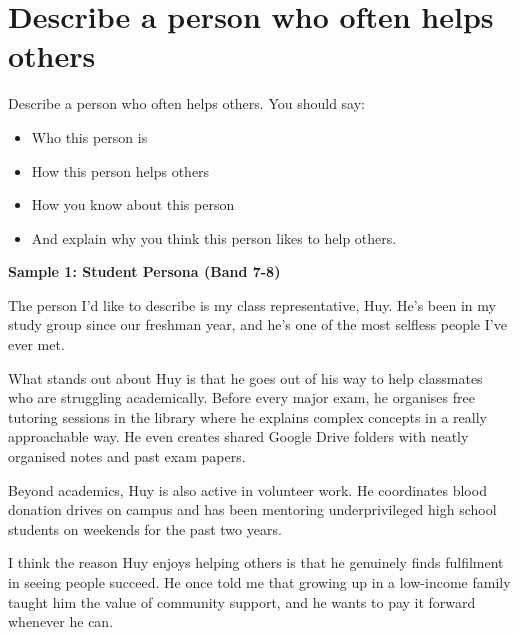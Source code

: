 \newpage

\section{Describe a person who often helps others}
\begin{ieltsprompt}
Describe a person who often helps others.
You should say:
\begin{itemize}[leftmargin=2em, itemsep=2pt]
\item Who this person is
\item How this person helps others
\item How you know about this person
\item And explain why you think this person likes to help others.
\end{itemize}
\end{ieltsprompt}
\begin{ieltsanswer}
\textbf{Sample 1: Student Persona (Band 7-8)}

The person I'd like to describe is my class representative, Huy. He's been in my study group since our freshman year, and he's one of the most selfless people I've ever met.

What stands out about Huy is that he goes out of his way to help classmates who are struggling academically. Before every major exam, he organises free tutoring sessions in the library where he explains complex concepts in a really approachable way. He even creates shared Google Drive folders with neatly organised notes and past exam papers.

Beyond academics, Huy is also active in volunteer work. He coordinates blood donation drives on campus and has been mentoring underprivileged high school students on weekends for the past two years.

I think the reason Huy enjoys helping others is that he genuinely finds fulfilment in seeing people succeed. He once told me that growing up in a low-income family taught him the value of community support, and he wants to pay it forward whenever he can.
\end{ieltsanswer}



